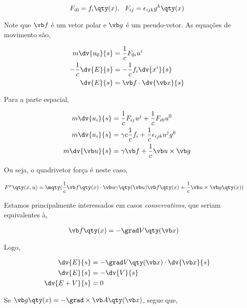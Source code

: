 \documentclass[twoside]{amsart}
\numberwithin{equation}{section}
\begin{document}
\begin{align}
    F_{i0}=f_i\qty(x),\ \ F_{ij}=\epsilon_{ijk}g^k\qty(x)
\end{align}

Note que $\vb f$ é um vetor polar e $\vb g$ é um pseudo-vetor. As equações de movimento são,

\begin{align}
    m\dv{u_0}{s}&=\frac1cF_{0i}u^i\\
    -\frac1c\dv{E}{s}&=-\frac1cf_i\dv{x^i}{s}\\
    \dv{E}{s}&=\vb f\cdot\dv{\vb x}{s}
\end{align}

Para a parte espacial,

\begin{align}
    m\dv{u_i}{s}&=\frac1cF_{ij}u^j+\frac1cF_{i0}u^0\\
    m\dv{u_i}{s}&=\gamma c \frac1cf_i+\frac1c\epsilon_{ijk}u^jg^k\\
    m\dv{\vb u}{s}&=\gamma\vb f+\frac1c\vb u\times\vb g
\end{align}

Ou seja, o quadrivetor força é neste caso,

\begin{align}
    F^\mu\qty(x,u)=\mqty(\frac1c\vb f\qty(x)\cdot \vb u&\gamma\qty(\vb u) \vb f\qty(x)+\frac1c\vb u\times\vb g\qty(x))
\end{align}

Estamos principalmente interessados em casos \emph{conservativos}, que seriam equivalentes à,

\begin{align}
    \vb f\qty(x)&=-\grad V\qty(\vb x)
\end{align}

Logo, 

\begin{align}
    \dv{E}{s}&=-\grad V\qty(\vb x)\cdot\dv{\vb x}{s}\\
    \dv{E}{s}&=-\dv{V}{s}\\
    \dv{E+V}{s}&=0
\end{align}

Se $\vb g\qty(x)=-\grad\times \vb A\qty(\vb x)$, segue que,
\end{document}
